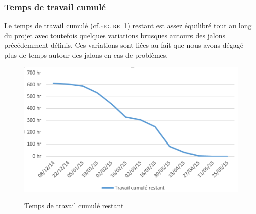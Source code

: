 \subsubsection{Temps de travail cumulé}
Le temps de travail cumulé (cf.\textsc{figure~\ref{fig:avancement}}) restant est assez équilibré tout au long du projet avec toutefois quelques variations brusques autours des jalons précédemment définis.
Ces variations sont liées au fait que nous avons dégagé plus de temps autour des jalons en cas de problèmes.

\begin{figure}[h]
	\centering
	\caption{Temps de travail cumulé restant}
		\includegraphics[width=\textwidth]{8-BilanPlanification/img/avancement.PNG}
	\label{fig:avancement}
\end{figure}